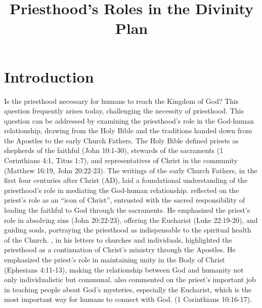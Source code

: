\documentclass[12pt,doc]{apa7}   	%
\title{Priesthood's Roles in the Divinity Plan}	%
\begin{document}
\maketitle
\renewcommand{\baselinestretch}{1}
\renewcommand{\baselinestretch}{1}

\section{Introduction}
Is the priesthood necessary for humans to reach the Kingdom of God? This question frequently arises today, challenging the necessity of priesthood. This question can be addressed by examining the priesthood’s role in the God-human relationship, drawing from the Holy Bible and the traditions handed down from the Apostles to the early Church Fathers. The Holy Bible \citep{nelson_nkjv} defined priests as shepherds of the faithful (John 10:1-30), stewards of the sacraments (1 Corinthians 4:1, Titus 1:7), and representatives of Christ in the community (Matthew 16:19, John 20:22-23). The writings of the early Church Fathers, in the first four centuries after Christ (AD), laid a foundational understanding of the priesthood’s role in mediating the God-human relationship.  \citet{priesthood_chrysostom} reflected on the priest’s role as an ``icon of Christ'', entrusted with the sacred responsibility of leading the faithful to God through the sacraments. He emphasized the priest’s role in absolving sins (John 20:22-23), offering the Eucharist (Luke 22:19-20), and guiding souls, portraying the priesthood as indispensable to the spiritual health of the Church.  \citet{epistles_ignatius}, in his letters to churches and individuals, highlighted the priesthood as a continuation of Christ’s ministry through the Apostles. He emphasized the priest’s role in maintaining unity in the Body of Christ (Ephesians 4:11-13), making the relationship between God and humanity not only individualistic but communal. \citet{st_basil_letters} also commented on the priest’s important job in teaching people about God’s mysteries, especially the Eucharist, which is the most important way for humans to connect with God. (1 Corinthians 10:16-17). 
\end{document}
